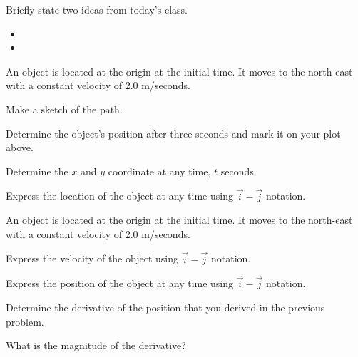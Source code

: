 \begin{problem}
\item Briefly state two ideas from today's class.
  \begin{itemize}
  \item
  \item
  \end{itemize}
\item An object is located at the origin at the initial time. It moves
  to the north-east with a constant velocity of 2.0 m/seconds.

  \begin{subproblem}
  \item Make a sketch of the path.
    \vfill
  \item Determine the object's position after three seconds and mark
    it on your plot above.
    \vspace{4em}
  \item Determine the $x$ and $y$ coordinate at any time, $t$ seconds.
    \vfill
  \item Express the location of the object at any time using
    $\vec{i}-\vec{j}$ notation.
    \vspace{3em}
  \end{subproblem}

  \clearpage

\item An object is located at the origin at the initial time. It moves
  to the north-east with a constant velocity of 2.0 m/seconds.

  \begin{subproblem}
  \item Express the velocity of the object using $\vec{i}-\vec{j}$
    notation.
    \vfill
  \item Express the position of the object at any time using
    $\vec{i}-\vec{j}$ notation.
    \vfill
  \item Determine the derivative of the position that you derived in
    the previous problem.
    \vfill
  \item What is the magnitude of the derivative?
    \vfill
  \end{subproblem}


\end{problem}



